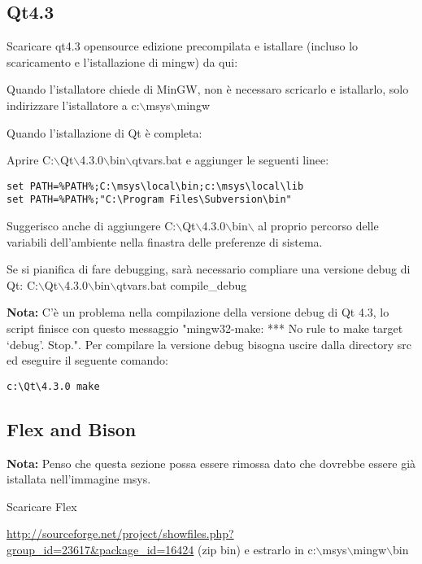 \subsection{Qt4.3}
Scaricare qt4.3 opensource edizione precompilata e istallare (incluso lo scaricamento e l'istallazione di mingw) da qui:


Quando l'istallatore chiede di MinGW, non è necessaro scricarlo e istallarlo, solo indirizzare l'istallatore a c:$\backslash$msys$\backslash$mingw

Quando l'istallazione di Qt è completa:

Aprire C:$\backslash$Qt$\backslash$4.3.0$\backslash$bin$\backslash$qtvars.bat e aggiunger le seguenti linee:

\begin{verbatim}
set PATH=%PATH%;C:\msys\local\bin;c:\msys\local\lib 
set PATH=%PATH%;"C:\Program Files\Subversion\bin" 
\end{verbatim}

Suggerisco anche di aggiungere C:$\backslash$Qt$\backslash$4.3.0$\backslash$bin$\backslash$ al proprio percorso delle variabili dell'ambiente nella finastra delle preferenze di sistema.

Se si pianifica di fare debugging, sarà necessario compliare una versione debug di Qt:
C:$\backslash$Qt$\backslash$4.3.0$\backslash$bin$\backslash$qtvars.bat compile\_debug

\textbf{Nota:} C'è un problema nella compilazione della versione debug di Qt 4.3, lo script finisce con questo messaggio  "mingw32-make: *** No rule to make target `debug'.  Stop.". Per compilare la versione debug bisogna uscire dalla directory src ed eseguire il seguente comando:

\begin{verbatim}
c:\Qt\4.3.0 make 
\end{verbatim}

\subsection{Flex and Bison}
\textbf{Nota:} Penso che questa sezione possa essere rimossa dato che dovrebbe essere già istallata nell'immagine msys.

Scaricare Flex

\url{http://sourceforge.net/project/showfiles.php?group\_id=23617&package\_id=16424} (zip bin) e estrarlo in c:$\backslash$msys$\backslash$mingw$\backslash$bin

